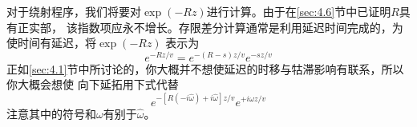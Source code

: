 对于绕射程序，我们将要对$\exp(-Rz)$进行计算。由于在\ref{sec:4.6}节中已证明$R$具有正实部，
该指数项应永不增长。存限差分计算通常是利用延迟时间完成的，为使时间有延迟，将$\exp(-Rz)$
表示为
\begin{equation}
e^{-Rz/v}=e^{-(R-s)z/v}e^{-sz/v}
\label{eq:4.7.1}
\end{equation}
正如\ref{sec:4.1}节中所讨论的，你大概并不想使延迟的时移与牯滞影响有联系，所以你大概会想使
向下延拓用下式代替
\begin{equation}
e^{-[R(-i\hat{\omega})+i\hat{\omega}]z/v}e^{+i\omega z/v}
\label{eq:ex4.7.2}
\end{equation}
注意其中的符号和$\omega$有别于$\hat{\omega}$。





